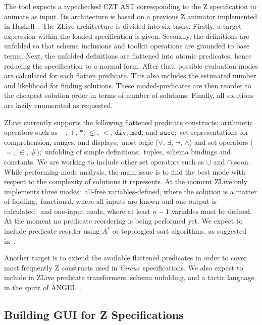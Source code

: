\documentclass{llncs}
\newcommand{\Circus}{{\sf\slshape Circus}}
\begin{document}
    The tool expects a typechecked CZT AST corresponding to the Z specification to animate
    as input. Its architecture is based on a previous Z animator implemented in Haskell~\cite{utting-jaza}.
    The ZLive architecture is divided into six tasks.
    Firstly, a target expression within the loaded specification is given.
    Secondly, the definitions are unfolded so that schema inclusions and toolkit operations
    are grounded to base terms. Next, the unfolded definitions are flattened into atomic
    predicates, hence reducing the specification to a normal form.
    After that, possible evaluation modes are calculated for each flatten predicate.
    This also includes the estimated number and likelihood for finding solutions.
    These moded-predicates are then reorder to the cheapest solution order in terms of
    number of solutions. Finally, all solutions are lazily enumerated as requested.

    ZLive currently supports the following flattened predicate constructs: arithmetic operators
    such as $-$, $+$, $*$, $\leq$, $<$, $\mathtt{div}$, $\mathtt{mod}$, and $\mathtt{succ}$;~set
    representations for comprehension, ranges, and displays;~most logic ($\forall$,
    $\exists$, $\lnot$, $\land$) and set operators ($=$, $\in$, $\#$);~unfolding of simple
    definitions;~tuples, schema bindings and constants.
    We are working to include other set operators such as $\cup$ and $\cap$ soon.
    While performing mode analysis, the main issue is to find the best mode with respect to
    the complexity of solutions it represents. At the moment ZLive only implements three modes:~all-free
    variables-defined, where the solution is a matter of fiddling;~functional, where all inputs are known
    and one output is calculated;~and one-input mode, where at least $n-1$ variables must be defined.
    At the moment no predicate reordering is being performed yet.
    We expect to include predicate reorder using $A^*$ or topological-sort algorithms,
    as suggested in~\cite{winikooff98}.

    Another target is to extend the available flattened predicates in order to cover most
    frequently Z constructs used in \Circus\ specifications.
    We also expect to include in ZLive predicate transformers, schema unfolding, and a
    tactic language in the spirit of ANGEL~\cite{z.others:angel}.

\subsection{Building GUI for Z Specifications}
\end{document}
